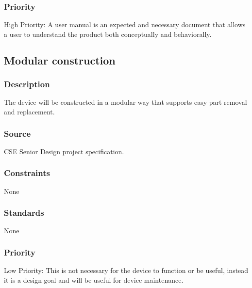 \subsubsection{Priority}
High Priority: A user manual is an expected and necessary document that allows a user to understand the product both conceptually and behaviorally.

\subsection{Modular construction}
\subsubsection{Description}
The device will be constructed in a modular way that supports easy part removal and replacement.
\subsubsection{Source}
CSE Senior Design project specification.
\subsubsection{Constraints}
None
\subsubsection{Standards}
None
\subsubsection{Priority}
Low Priority: This is not necessary for the device to function or be useful, instead it is a design goal and will be useful for device maintenance.

